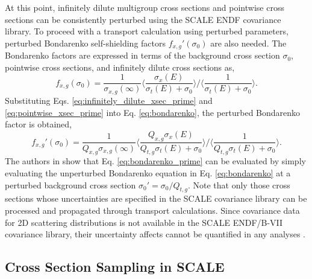 At this point, infinitely dilute multigroup cross sections and pointwise cross sections can be consistently perturbed using the \ac{SCALE} \ac{ENDF} covariance library. To proceed with a transport calculation using perturbed parameters, perturbed Bondarenko self-shielding factors $f_{x,g}'(\sigma_0)$ are also needed. The Bondarenko factors are expressed in terms of the background cross section $\sigma_0$, pointwise cross sections, and infinitely dilute cross sections as,     
\begin{equation}
\label{eq:bondarenko}
   f_{x,g}(\sigma_0) = \frac{1}{\sigma_{x,g}(\infty)}
    \Big\langle \frac{\sigma_x(E)}{\sigma_t(E) + \sigma_0}\Big\rangle
     \Big/
     \Big\langle \frac{1}{\sigma_t(E) + \sigma_0}\Big\rangle.
\end{equation}
Substituting Eqs. \ref{eq:infinitely_dilute_xsec_prime} and \ref{eq:pointwise_xsec_prime} into Eq. \ref{eq:bondarenko}, the perturbed Bondarenko factor is obtained,
\begin{equation}
\label{eq:bondarenko_prime}
   f_{x,g}'(\sigma_0) = \frac{1}{Q_{x,g}\sigma_{x,g}(\infty)}
    \Big\langle \frac{Q_{x,g}\sigma_x(E)}{Q_{t,g}\sigma_t(E)+\sigma_0}\Big\rangle
     \Big/
     \Big\langle \frac{1}{Q_{t,g}\sigma_t(E) + \sigma_0}\Big\rangle.
\end{equation}
The authors in \cite{Williams_Ilas} show that Eq. \ref{eq:bondarenko_prime} can be evaluated by simply evaluating the unperturbed Bondarenko equation in Eq. 
\ref{eq:bondarenko} at a perturbed background cross section $\sigma_0' = \sigma_0/ Q_{t,g}$. Note that only those cross sections whose uncertainties are specified in the \ac{SCALE} covariance library can be processed and propagated through transport calculations. Since covariance data for 2D scattering distributions is not available in the \ac{SCALE} \ac{ENDF}/B-VII covariance library, their uncertainty affects cannot be quantified in any analyses \cite{Williams_Ilas}. 
 
\subsection{Cross Section Sampling in SCALE}
\label{subsec:scale_sampler}  

